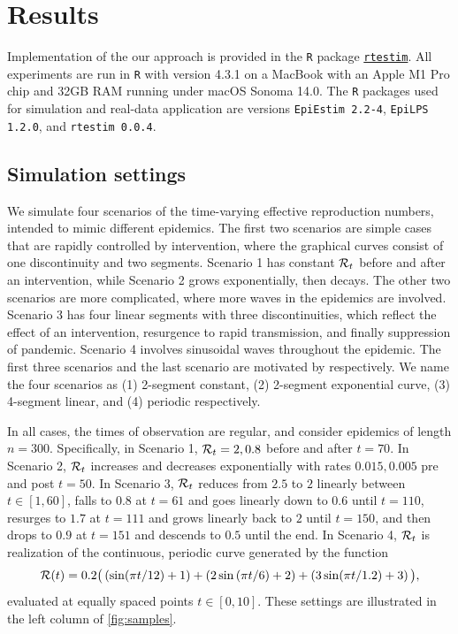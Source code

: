 \section{Results}

Implementation of the our approach is provided in the \texttt{R} package
\href{https://dajmcdon.github.io/rtestim/}{\texttt{rtestim}}. All experiments
are run in \texttt{R} with version 4.3.1 on a MacBook with an Apple M1 Pro chip
and 32GB RAM running under macOS Sonoma 14.0. The \texttt{R} packages used for
simulation and real-data application are versions \texttt{EpiEstim 2.2-4},
\texttt{EpiLPS 1.2.0}, and \texttt{rtestim 0.0.4}. 

\subsection{Simulation settings}

We simulate four scenarios of the time-varying effective reproduction numbers,
intended to mimic different epidemics. The first two scenarios are simple cases
that are rapidly controlled by intervention, where the graphical curves consist
of one discontinuity and two segments. Scenario 1 has constant $\mathcal{R}_t$ before
and after an intervention, while Scenario 2 grows exponentially, then decays.
The other two scenarios are more complicated, where more waves in the epidemics
are involved. Scenario 3 has four linear segments with three discontinuities,
which reflect the effect of an intervention, resurgence to rapid transmission,
and finally suppression of pandemic. Scenario 4 involves sinusoidal waves
throughout the epidemic.
The first three scenarios and the last scenario are motivated by
\citep{parag2021improved, gressani2022epilps} respectively. 
We name the four scenarios as (1) 2-segment constant, (2) 2-segment exponential 
curve, (3) 4-segment linear, and (4) periodic respectively. 

In all cases, the times of observation are regular, and consider epidemics of
length $n=300$. Specifically, in Scenario 1, $\mathcal{R}_t = 2, 0.8$ before and after
$t=70$. In Scenario 2, $\mathcal{R}_t$ increases and decreases exponentially with
rates $0.015, 0.005$ pre and post $t=50$. In Scenario 3, $\mathcal{R}_t$ reduces from
$2.5$ to $2$ linearly between $t\in[1,60]$, falls to $0.8$ at $t=61$ and goes
linearly down to $0.6$ until $t=110$, resurges to $1.7$ at $t=111$ and grows
linearly back to $2$ until $t=150$, and then drops to $0.9$ at $t=151$ and
descends to $0.5$ until the end. In Scenario 4, $\mathcal{R}_t$ is realization of the
continuous, periodic curve generated by the function $$\mathcal{R}(t) = 0.2 \big(
\left(\sin(\pi t/12) + 1\right) + \left(2 \sin\left(\pi t / 6\right) + 2\right) + \left(3
\sin(\pi t / 1.2) + 3\right)\big),$$ evaluated at equally spaced points $t\in [0,10]$. These
settings are illustrated in the left column of \autoref{fig:samples}.


